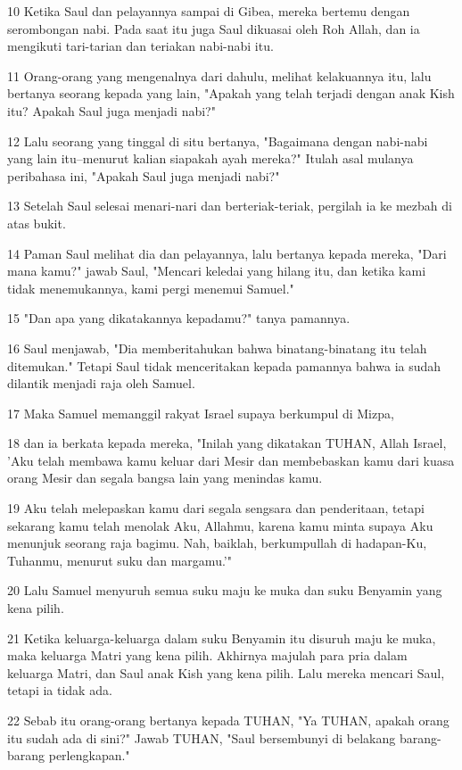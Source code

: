 \par 10 Ketika Saul dan pelayannya sampai di Gibea, mereka bertemu dengan serombongan nabi. Pada saat itu juga Saul dikuasai oleh Roh Allah, dan ia mengikuti tari-tarian dan teriakan nabi-nabi itu.
\par 11 Orang-orang yang mengenalnya dari dahulu, melihat kelakuannya itu, lalu bertanya seorang kepada yang lain, "Apakah yang telah terjadi dengan anak Kish itu? Apakah Saul juga menjadi nabi?"
\par 12 Lalu seorang yang tinggal di situ bertanya, "Bagaimana dengan nabi-nabi yang lain itu--menurut kalian siapakah ayah mereka?" Itulah asal mulanya peribahasa ini, "Apakah Saul juga menjadi nabi?"
\par 13 Setelah Saul selesai menari-nari dan berteriak-teriak, pergilah ia ke mezbah di atas bukit.
\par 14 Paman Saul melihat dia dan pelayannya, lalu bertanya kepada mereka, "Dari mana kamu?" jawab Saul, "Mencari keledai yang hilang itu, dan ketika kami tidak menemukannya, kami pergi menemui Samuel."
\par 15 "Dan apa yang dikatakannya kepadamu?" tanya pamannya.
\par 16 Saul menjawab, "Dia memberitahukan bahwa binatang-binatang itu telah ditemukan." Tetapi Saul tidak menceritakan kepada pamannya bahwa ia sudah dilantik menjadi raja oleh Samuel.
\par 17 Maka Samuel memanggil rakyat Israel supaya berkumpul di Mizpa,
\par 18 dan ia berkata kepada mereka, "Inilah yang dikatakan TUHAN, Allah Israel, 'Aku telah membawa kamu keluar dari Mesir dan membebaskan kamu dari kuasa orang Mesir dan segala bangsa lain yang menindas kamu.
\par 19 Aku telah melepaskan kamu dari segala sengsara dan penderitaan, tetapi sekarang kamu telah menolak Aku, Allahmu, karena kamu minta supaya Aku menunjuk seorang raja bagimu. Nah, baiklah, berkumpullah di hadapan-Ku, Tuhanmu, menurut suku dan margamu.'"
\par 20 Lalu Samuel menyuruh semua suku maju ke muka dan suku Benyamin yang kena pilih.
\par 21 Ketika keluarga-keluarga dalam suku Benyamin itu disuruh maju ke muka, maka keluarga Matri yang kena pilih. Akhirnya majulah para pria dalam keluarga Matri, dan Saul anak Kish yang kena pilih. Lalu mereka mencari Saul, tetapi ia tidak ada.
\par 22 Sebab itu orang-orang bertanya kepada TUHAN, "Ya TUHAN, apakah orang itu sudah ada di sini?" Jawab TUHAN, "Saul bersembunyi di belakang barang-barang perlengkapan."
